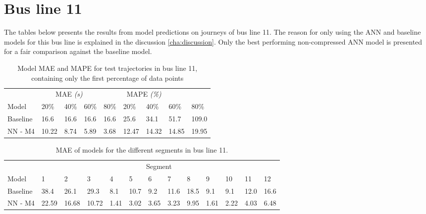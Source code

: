\section{Bus line 11}
The tables below presents the results from model predictions on journeys of bus line 11. The reason for only using the ANN and baseline models for this bus line is explained in the discussion \ref{cha:discussion}. Only the best performing non-compressed ANN model is presented for a fair comparison against the baseline model.
\begin{table}[H]
	\centering
	\caption{Model MAE and MAPE for test trajectories in bus line 11, containing only the first percentage of data points}
	\label{tbl:models-mae-and-mape-211}
	\begin{tabular}{l | l | l | l | l || l | l | l | l }
		& \multicolumn{3}{c}{MAE \textit{(s)}} & \multicolumn{4}{c}{MAPE \textit{(\%)}} \\
		Model      & 20\% & 40\% & 60\% & 80\% & 20\% & 40\% & 60\% & 80\% \\
		\hline
		Baseline & 16.6 & 16.6 & 16.6 & 16.6  & 25.6 & 34.1 & 51.7 & 109.0 \\
		NN - M4        & 10.22& 8.74& 5.89& 3.68& 12.47& 14.32& 14.85& 19.95 \\
	\end{tabular}
\end{table}

\begin{table}[H]
	\centering
	\caption{MAE of models for the different segments in bus line 11.}
	\label{tbl:model-mae-of-segs-211}
	\begin{adjustbox}{center}
	\begin{tabular}{ l | l | l | l | l | l | l | l | l | l | l | l | l}
		& \multicolumn{12}{c}{Segment} \\
		Model       & 1 & 2 & 3 & 4 & 5 & 6 & 7 & 8 & 9 & 10 & 11 & 12 \\
		\hline
		Baseline  & 38.4 & 26.1 & 29.3 & 8.1 & 10.7 & 9.2 & 11.6 & 18.5 & 9.1 & 9.1  & 12.0 & 16.6 \\
		NN - M4         & 22.59& 16.68& 10.72& 1.41& 3.02& 3.65& 3.23& 9.95& 1.61& 2.22& 4.03& 6.48\\
	\end{tabular}
	\end{adjustbox}
\end{table}

